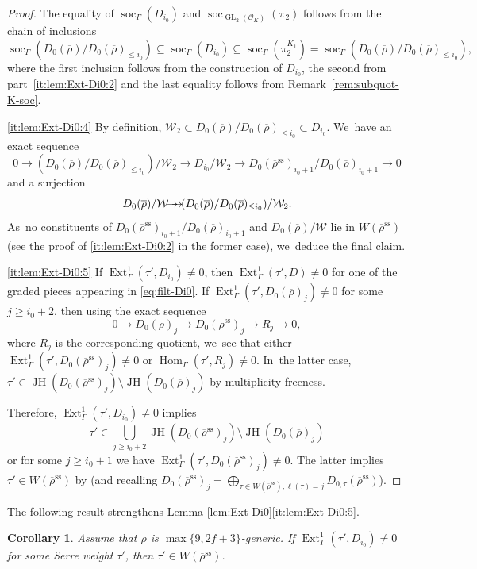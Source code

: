 \documentclass[JEP,XML,SOM,Unicode,NoFloatCountersInSection, NoEqCountersInSection,published]{cedram}
\newcommand{\onto}{\mathchoice{\to\hspace*{-5mm}\to}{\mathrel{\hbox{$\to\hspace*{-2.85mm}\to$}}}{\to\hspace*{-3mm}\to}{\to\hspace*{-3mm}\to}}
\let\backslash\setminus
\newcommand{\cO}{\mathcal{O}}
\newcommand{\cW}{\mathcal{W}}
\renewcommand{\ss}{\mathrm{ss}}
\newcommand{\brho}{\overline{\rho}}
\DeclareMathOperator{\Ext}{Ext}
\DeclareMathOperator{\GL}{GL}
\DeclareMathOperator{\Hom}{Hom}
\DeclareMathOperator{\JH}{\mathrm{JH}}
\DeclareMathOperator{\soc}{soc}
\theoremstyle{plain}
\newtheorem{cor}[prop]{Corollary}
\theoremstyle{definition}
\begin{document}
\begin{proof}
The equality of $\soc_{\Gamma}(D_{i_0})$ and $\soc_{\GL_2(\cO_K)}(\pi_2)$ follows from the chain of inclusions
\[
\soc_{\Gamma}(D_0(\brho)/D_0(\brho)_{\le i_0})\subseteq \soc_{\Gamma}(D_{i_0})\subseteq \soc_{\Gamma}(\pi_2^{K_1})=\soc_{\Gamma}(D_0(\brho)/D_0(\brho)_{\le i_0}),
\]
where the first inclusion follows from the construction of $D_{i_0}$, the second from part~\eqref{it:lem:Ext-Di0:2} and the last equality follows from Remark~\ref{rem:subquot-K-soc}.

\eqref{it:lem:Ext-Di0:4}
By definition, $\mathcal{W}_2 \subset D_0(\brho)/D_0(\brho)_{\le i_0} \subset D_{i_0}$. We~have an exact sequence
\begin{equation*}
0 \to (D_0(\brho)/D_0(\brho)_{\le i_0})/\cW_2 \to D_{i_0}/\mathcal{W}_2 \to D_0(\brho^{\ss})_{i_0+1}/D_0(\brho)_{i_0+1} \to 0
\end{equation*}
and a surjection
\[
D_0(\brho)/\cW \onto (D_0(\brho)/D_0(\brho)_{\le i_0})/\cW_2.
\]
As~no constituents of $D_0(\brho^{\ss})_{i_0+1}/D_0(\brho)_{i_0+1}$ and $D_0(\brho)/\cW$ lie in $W(\brho^\ss)$ (see the proof of \eqref{it:lem:Ext-Di0:2} in the former case), we~deduce the final claim.

\eqref{it:lem:Ext-Di0:5}
If $\Ext^1_{\Gamma}(\tau',D_{i_0}) \ne 0$, then $\Ext^1_{\Gamma}(\tau',D) \ne 0$ for one of the graded pieces appearing in \eqref{eq:filt-Di0}.
If $\Ext^1_{\Gamma}(\tau',D_0(\brho)_j)\neq0$ for some $j\geq i_0+2$, then using the exact sequence
\[
0\to D_0(\brho)_j\to D_0(\brho^\ss)_{j}\to R_j\to 0,
\]
where $R_j$ is the corresponding quotient, we~see that either $\Ext^1_{\Gamma}(\tau',D_0(\brho^\ss)_j)\neq0$ or $\Hom_{\Gamma}(\tau',R_j)\neq0$. In~the latter case, $\tau' \in \JH(D_0(\brho^\ss)_j)\backslash \JH(D_0(\brho)_j)$ by multiplicity-freeness.

Therefore, $\Ext^1_{\Gamma}(\tau',D_{i_0}) \ne 0$ implies
\[
\tau' \in \bigcup_{j\geq i_0+2}\JH(D_0(\brho^\ss)_j)\backslash \JH(D_0(\brho)_j)
\]
or for some $j \ge i_0+1$ we have $\Ext^1_{\Gamma}(\tau',D_0(\brho^\ss)_j)\neq0$.
The latter implies $\tau'\in W(\brho^\ss)$ by \cite[Lem.\,2.25, 2.26]{HuWang} (and recalling $D_0(\brho^{\ss})_j=\bigoplus_{\tau\in W(\brho^\ss),\ell(\tau)=j}D_{0,\tau}(\brho^\ss)$).
\end{proof}

The following result strengthens Lemma \ref{lem:Ext-Di0}\eqref{it:lem:Ext-Di0:5}.

\begin{cor}\label{cor:Ext-Di0}
{Assume that $\brho$ is $\max\{9,2f+3\}$-generic.}
If $\Ext^1_{\Gamma}(\tau',D_{i_0})\neq0$ for some Serre weight $\tau'$, then $\tau'\in W(\brho^\ss)$.
\end{cor}
\end{document}
